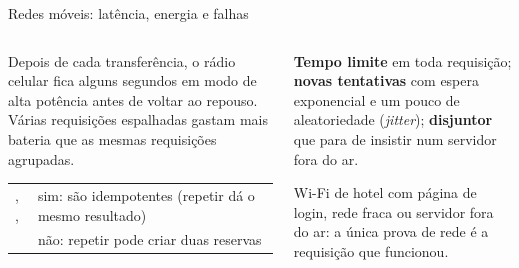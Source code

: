 \begin{frame}{Redes móveis: latência, energia e falhas}
  \begin{columns}[T]
    \begin{column}{0.5\textwidth}
      \begin{pordentro}
        Depois de cada transferência, o rádio celular fica alguns segundos em modo de alta potência antes de voltar ao repouso. Várias requisições espalhadas gastam mais bateria que as mesmas requisições agrupadas.
      \end{pordentro}
      \scriptsize
      \begin{tabularx}{\linewidth}{@{}l L@{}}
        \toprule
         &  \\
        \midrule
        , ,  & sim: são idempotentes (repetir dá o mesmo resultado) \\
         & não: repetir pode criar duas reservas \\
        \bottomrule
      \end{tabularx}
    \end{column}
    \begin{column}{0.48\textwidth}
      \begin{conceito}
        \textbf{Tempo limite} em toda requisição; \textbf{novas tentativas} com espera exponencial e um pouco de aleatoriedade (\emph{jitter}); \textbf{disjuntor} que para de insistir num servidor fora do ar.
      \end{conceito}
      \begin{atencao}
        Wi-Fi de hotel com página de login, rede fraca ou servidor fora do ar: a única prova de rede é a requisição que funcionou.
      \end{atencao}
    \end{column}
  \end{columns}
\end{frame}

